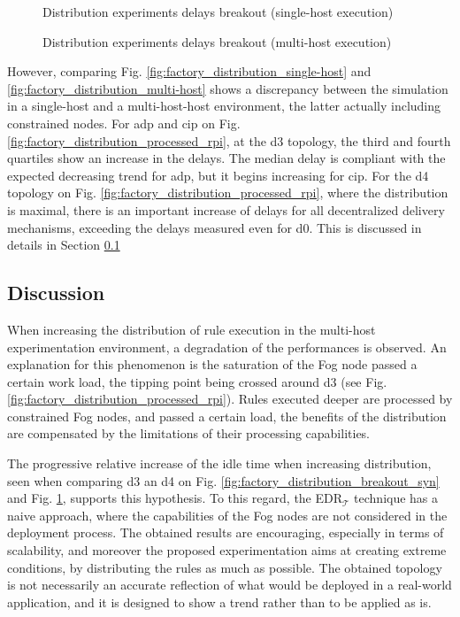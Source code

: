\documentclass{iosart2c}
\newcommand{\edrt}{EDR$_{\mathcal{T}}$\xspace}
\begin{document}
\begin{figure}
	\Centering
	\caption{Distribution experiments delays breakout (single-host execution)}
	\label{fig:factory_distribution_breakout_syn}
	\scalebox{0.78}{
		
	}
	\caption{Distribution experiments delays breakout (multi-host execution)}
	\label{fig:factory_distribution_breakout_rpi}
	\scalebox{0.78}{
		
	}
\end{figure}

However, comparing Fig. \ref{fig:factory_distribution_single-host} and \ref{fig:factory_distribution_multi-host} shows a discrepancy between the simulation in a single-host and a multi-host-host environment, the latter actually including constrained nodes.
For \gls{adp} and \gls{cip} on Fig. \ref{fig:factory_distribution_processed_rpi}, at the d3 topology, the third and fourth quartiles show an increase in the delays.
The median delay is compliant with the expected decreasing trend for \gls{adp}, but it begins increasing for \gls{cip}.
For the d4 topology on Fig. \ref{fig:factory_distribution_processed_rpi}, where the distribution is maximal, there is an important increase of delays for all decentralized delivery mechanisms, exceeding the delays measured even for d0.
This is discussed in details in Section \textsection \ref{subs:discussion}

\subsection{Discussion}
\label{subs:discussion}

When increasing the distribution of rule execution in the multi-host experimentation environment, a degradation of the performances is observed.
An explanation for this phenomenon is the saturation of the Fog node passed a certain work load, the tipping point being crossed around d3 (see Fig. \ref{fig:factory_distribution_processed_rpi}). 
Rules executed deeper are processed by constrained Fog nodes, and passed a certain load, the benefits of the distribution are compensated by the limitations of their processing capabilities.

The progressive relative increase of the idle time when increasing distribution, seen when comparing d3 an d4 on Fig. \ref{fig:factory_distribution_breakout_syn} and Fig. \ref{fig:factory_distribution_breakout_rpi}, supports this hypothesis.
To this regard, the \edrt technique has a naive approach, where the capabilities of the Fog nodes are not considered in the deployment process.
The obtained results are encouraging, especially in terms of scalability, and moreover the proposed experimentation aims at creating extreme conditions, by distributing the rules as much as possible.
The obtained topology is not necessarily an accurate reflection of what would be deployed in a real-world application, and it is designed to show a trend rather than to be applied as is.
\end{document}
